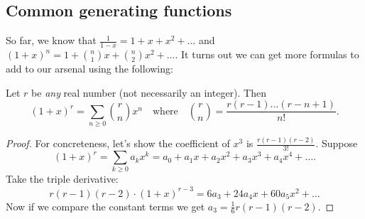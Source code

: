 \documentclass[11pt]{scrartcl}
\begin{document}
\subsection{Common generating functions}
So far, we know that $\frac{1}{1-x} = 1 + x + x^2 + \dots$
and $(1+x)^n = 1 + \binom n1 x + \binom n2 x^2 + \dots$.
It turns out we can get more formulas to add to our
arsenal using the following:
\begin{theorem}
  Let $r$ be \emph{any} real number (not necessarily an integer).
  Then
  \[ (1+x)^r = \sum_{n \ge 0} \binom{r}{n} x^n
    \quad\text{where}\quad
    \binom{r}{n}
    = \frac{r(r-1) \dots (r-n+1)}{n!}. \]
\end{theorem}
\begin{proof}
  For concreteness,
  let's show the coefficient of $x^3$ is $\frac{r(r-1)(r-2)}{3!}$.
  Suppose
  \[ (1+x)^r = \sum_{k \ge 0} a_k x^k
  = a_0 + a_1x + a_2x^2 + a_3x^3 + a_4x^4 +  \dots. \]
  Take the triple derivative:
  \[
    r(r-1)(r-2) \cdot (1+x)^{r-3}
    = 6a_3 + 24a_4x + 60a_5 x^2 + \dots
  \]
  Now if we compare the constant terms
  we get $a_3 = \frac16 r(r-1)(r-2)$.
\end{proof}
\end{document}
